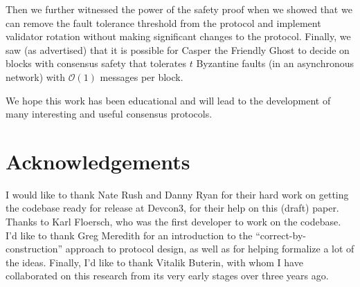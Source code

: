 \documentclass{article}
\theoremstyle{definition}
\begin{document}
Then we further witnessed the power of the safety proof when we showed that we can remove the fault tolerance threshold from the protocol and implement validator rotation without making significant changes to the protocol. Finally, we saw (as advertised) that it is possible for Casper the Friendly Ghost to decide on blocks with consensus safety that tolerates $t$ Byzantine faults (in an asynchronous network) with $\mathcal{O}(1)$ messages per block.

We hope this work has been educational and will lead to the development of many interesting and useful consensus protocols.

\section{Acknowledgements}

I would like to thank Nate Rush and Danny Ryan for their hard work on getting the codebase ready for release at Devcon3, for their help on this (draft) paper. Thanks to Karl Floersch, who was the first developer to work on the codebase. I'd like to thank Greg Meredith for an introduction to the ``correct-by-construction'' approach to protocol design, as well as for helping formalize a lot of the ideas. Finally, I'd like to thank Vitalik Buterin, with whom I have collaborated on this research from its very early stages over three years ago.



\end{document}
